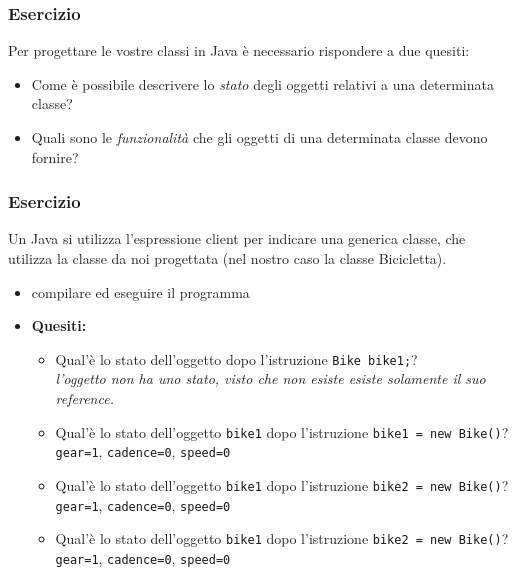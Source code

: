 \documentclass{article}
\theoremstyle{definition}
\begin{document}
\subsubsection{Esercizio}

Per progettare le vostre classi in Java \`e necessario rispondere a due quesiti:
\begin{itemize}
\item Come \`e possibile descrivere lo \emph{stato} degli oggetti relativi a una determinata classe?
\item Quali sono le \emph{funzionalit\`a} che gli oggetti di una determinata classe devono fornire?
\end{itemize}





\subsubsection{Esercizio}

Un Java si utilizza l'espressione client per indicare una generica classe, che utilizza la classe da noi progettata (nel nostro caso la classe Bicicletta). 



\begin{itemize}
\item compilare ed eseguire il programma
\end{itemize}

\begin{itemize}
\item 
\textbf{Quesiti:}\\
\begin{itemize}
\item Qual'\`e lo stato dell'oggetto dopo l'istruzione \texttt{Bike bike1;}?\\
\emph{l'oggetto non ha uno stato, visto che non esiste esiste solamente il suo reference.}
\item Qual'\`e lo stato dell'oggetto  \texttt{bike1} dopo l'istruzione  \texttt{bike1 = new Bike()}?\\
 \texttt{gear=1}, \texttt{cadence=0}, \texttt{speed=0}
\item Qual'\`e lo stato dell'oggetto  \texttt{bike1} dopo l'istruzione \texttt{bike2 = new Bike()}?\\
 \texttt{gear=1}, \texttt{cadence=0}, \texttt{speed=0}
\item Qual'\`e lo stato dell'oggetto  \texttt{bike1} dopo l'istruzione \texttt{bike2 = new Bike()}?\\
 \texttt{gear=1}, \texttt{cadence=0}, \texttt{speed=0}
\end{itemize}
\end{itemize}
\end{document}
